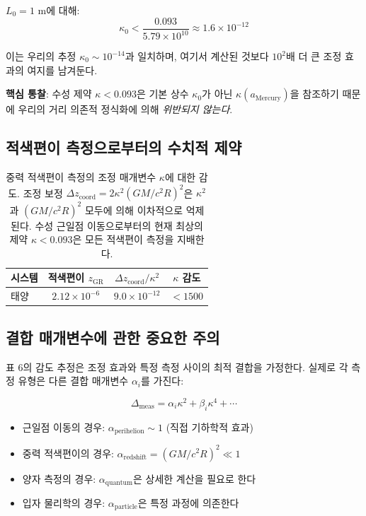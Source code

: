 \documentclass[11pt,a4paper]{article}
\begin{document}
$L_0 = 1$ m에 대해:
\begin{equation}
\kappa_0 < \frac{0.093}{5.79 \times 10^{10}} \approx 1.6 \times 10^{-12}
\end{equation}

이는 우리의 추정 $\kappa_0 \sim 10^{-14}$과 일치하며, 여기서 계산된 것보다 $10^2$배 더 큰 조정 효과의 여지를 남겨둔다.

\textbf{핵심 통찰}: 수성 제약 $\kappa < 0.093$은 기본 상수 $\kappa_0$가 아닌 $\kappa(a_{\text{Mercury}})$을 참조하기 때문에 우리의 거리 의존적 정식화에 의해 \textit{위반되지 않는다}.

\subsection{적색편이 측정으로부터의 수치적 제약}

\begin{table}[htbp]
\centering
\begin{tabular}{lccc}
	\toprule
	\textbf{시스템} & \textbf{적색편이 $z_{\text{GR}}$} & \textbf{$\Delta z_{\text{coord}}/\kappa^2$} & \textbf{$\kappa$ 감도} \\
	\midrule
	태양 & $2.12\times10^{-6}$ & $9.0\times10^{-12}$ & $<1500$ \\
	\bottomrule
\end{tabular}
\caption{중력 적색편이 측정의 조정 매개변수 $\kappa$에 대한 감도. 조정 보정 $\Delta z_{\text{coord}} = 2\kappa^2 (GM/c^2R)^2$은 $\kappa^2$과 $(GM/c^2R)^2$ 모두에 의해 이차적으로 억제된다. 수성 근일점 이동으로부터의 현재 최상의 제약 $\kappa < 0.093$은 모든 적색편이 측정을 지배한다.}
\end{table}

\subsection{결합 매개변수에 관한 중요한 주의}

표 6의 감도 추정은 조정 효과와 특정 측정 사이의 최적 결합을 가정한다. 실제로 각 측정 유형은 다른 결합 매개변수 $\alpha_i$를 가진다:

\begin{equation}
\Delta_{\text{meas}} = \alpha_i \kappa^2 + \beta_i \kappa^4 + \cdots
\end{equation}

\begin{itemize}
\item 근일점 이동의 경우: $\alpha_{\text{perihelion}} \sim 1$ (직접 기하학적 효과)
\item 중력 적색편이의 경우: $\alpha_{\text{redshift}} = (GM/c^2R)^2 \ll 1$
\item 양자 측정의 경우: $\alpha_{\text{quantum}}$은 상세한 계산을 필요로 한다
\item 입자 물리학의 경우: $\alpha_{\text{particle}}$은 특정 과정에 의존한다
\end{itemize}
\end{document}
